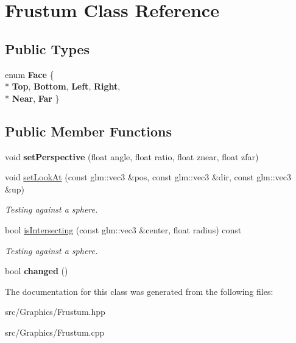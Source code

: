 \hypertarget{class_frustum}{\section{Frustum Class Reference}
\label{class_frustum}
}
\subsection*{Public Types}
\begin{DoxyCompactItemize}
\item 
\hypertarget{class_frustum_ace19a96bed0212d446a02991b336d50d}{enum {\bfseries Face} \{ \\*
{\bfseries Top}, 
{\bfseries Bottom}, 
{\bfseries Left}, 
{\bfseries Right}, 
\\*
{\bfseries Near}, 
{\bfseries Far}
 \}}\label{class_frustum_ace19a96bed0212d446a02991b336d50d}

\end{DoxyCompactItemize}
\subsection*{Public Member Functions}
\begin{DoxyCompactItemize}
\item 
\hypertarget{class_frustum_a324d013a34add360bbf8a6eb4b095549}{void {\bfseries set\+Perspective} (float angle, float ratio, float znear, float zfar)}\label{class_frustum_a324d013a34add360bbf8a6eb4b095549}

\item 
\hypertarget{class_frustum_a329f42eec391f45fae390b10483ff9eb}{void \hyperlink{class_frustum_a329f42eec391f45fae390b10483ff9eb}{set\+Look\+At} (const glm\+::vec3 \&pos, const glm\+::vec3 \&dir, const glm\+::vec3 \&up)}\label{class_frustum_a329f42eec391f45fae390b10483ff9eb}

\begin{DoxyCompactList}\small\item\em Testing against a sphere. \end{DoxyCompactList}\item 
\hypertarget{class_frustum_aaf2fcddd7f6105e303f110f2a4ecac1b}{bool \hyperlink{class_frustum_aaf2fcddd7f6105e303f110f2a4ecac1b}{is\+Intersecting} (const glm\+::vec3 \&center, float radius) const }\label{class_frustum_aaf2fcddd7f6105e303f110f2a4ecac1b}

\begin{DoxyCompactList}\small\item\em Testing against a sphere. \end{DoxyCompactList}\item 
\hypertarget{class_frustum_a478873b2d524b3e282fc0bdd6f63d320}{bool {\bfseries changed} ()}\label{class_frustum_a478873b2d524b3e282fc0bdd6f63d320}

\end{DoxyCompactItemize}


The documentation for this class was generated from the following files\+:\begin{DoxyCompactItemize}
\item 
src/\+Graphics/Frustum.\+hpp\item 
src/\+Graphics/Frustum.\+cpp\end{DoxyCompactItemize}
